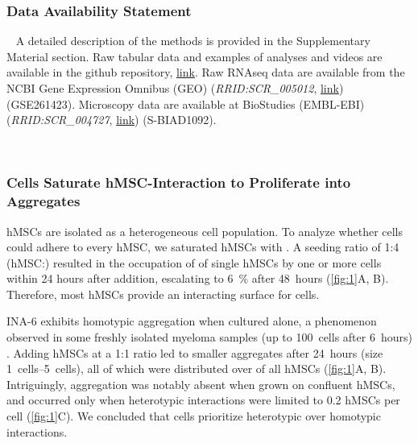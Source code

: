 
\subsubsection*{Data Availability Statement}
\ %
A detailed description of the methods is provided in the Supplementary Material section. Raw
tabular data and examples of analyses and videos are available in the github repository, \href{https://github.com/markur4/Supplemental-INA-6-Subpopulations-and-Aggregation-Detachment-Dynamics}{link}.
Raw RNAseq data are available from the NCBI Gene Expression Omnibus (GEO)
(\textit{RRID:SCR\_005012}, \href{https://www.ncbi.nlm.nih.gov/geo/query/acc.cgi?acc=GSE261423}{link}) (GSE261423). Microscopy data are available at BioStudies
(EMBL-EBI) (\textit{RRID:SCR\_004727}, \href{https://www.ebi.ac.uk/biostudies/bioimages/studies/S-BIAD1092?key=69bafe9c-74ff-492b-9e68-bd42655c4d1b}{link}) (S-BIAD1092).

\newpage






\label{C1:results}
\ %
\subsubsection*{\INA Cells Saturate hMSC-Interaction to Proliferate into Aggregates}
hMSCs are isolated as a heterogeneous cell population. To analyze whether \INA
cells could adhere to every hMSC, we saturated hMSCs with \INA. A seeding ratio
of 1:4 (hMSC:\INA) resulted in the occupation of 
of single hMSCs by one or more \INA cells within 24 hours after \INA addition,
escalating to \SI{6}{\percent} after \SI{48}{hours} (\autoref{fig:1}A, B).
Therefore, most hMSCs provide an interacting surface for \INA cells.

INA-6 exhibits homotypic aggregation when cultured alone, a phenomenon observed
in some freshly isolated myeloma samples (up to \SI{100}{cells} after
\SI{6}{hours})
\cite{kawanoHomotypicCellAggregations1991,okunoVitroGrowthPattern1991}. Adding
hMSCs at a 1:1 ratio led to smaller aggregates after \SI{24}{hours} (size
\SIrange{1}{5}{cells}), all of which were distributed over
 of all hMSCs (\autoref{fig:1}A, B). Intriguingly,
\INA aggregation was notably absent when grown on confluent hMSCs, and occurred
only when heterotypic interactions were limited to 0.2 hMSCs per \INA cell
(\autoref{fig:1}C). We concluded that \INA cells prioritize heterotypic over
homotypic interactions.

